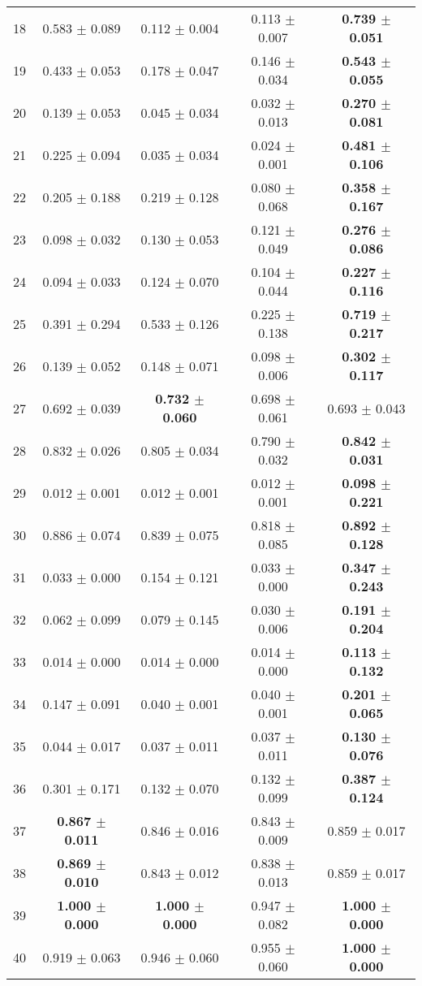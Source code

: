 \begin{table}[!ht]
{\begin{tabular}{r c c c c}
18 & 0.583 $\pm$ 0.089 & 0.112 $\pm$ 0.004 & 0.113 $\pm$ 0.007 & \textbf{0.739 $\pm$ 0.051} \\
19 & 0.433 $\pm$ 0.053 & 0.178 $\pm$ 0.047 & 0.146 $\pm$ 0.034 & \textbf{0.543 $\pm$ 0.055} \\
20 & 0.139 $\pm$ 0.053 & 0.045 $\pm$ 0.034 & 0.032 $\pm$ 0.013 & \textbf{0.270 $\pm$ 0.081} \\
21 & 0.225 $\pm$ 0.094 & 0.035 $\pm$ 0.034 & 0.024 $\pm$ 0.001 & \textbf{0.481 $\pm$ 0.106} \\
22 & 0.205 $\pm$ 0.188 & 0.219 $\pm$ 0.128 & 0.080 $\pm$ 0.068 & \textbf{0.358 $\pm$ 0.167} \\
23 & 0.098 $\pm$ 0.032 & 0.130 $\pm$ 0.053 & 0.121 $\pm$ 0.049 & \textbf{0.276 $\pm$ 0.086} \\
24 & 0.094 $\pm$ 0.033 & 0.124 $\pm$ 0.070 & 0.104 $\pm$ 0.044 & \textbf{0.227 $\pm$ 0.116} \\
25 & 0.391 $\pm$ 0.294 & 0.533 $\pm$ 0.126 & 0.225 $\pm$ 0.138 & \textbf{0.719 $\pm$ 0.217} \\
26 & 0.139 $\pm$ 0.052 & 0.148 $\pm$ 0.071 & 0.098 $\pm$ 0.006 & \textbf{0.302 $\pm$ 0.117} \\
27 & 0.692 $\pm$ 0.039 & \textbf{0.732 $\pm$ 0.060} & 0.698 $\pm$ 0.061 & 0.693 $\pm$ 0.043 \\
28 & 0.832 $\pm$ 0.026 & 0.805 $\pm$ 0.034 & 0.790 $\pm$ 0.032 & \textbf{0.842 $\pm$ 0.031} \\
29 & 0.012 $\pm$ 0.001 & 0.012 $\pm$ 0.001 & 0.012 $\pm$ 0.001 & \textbf{0.098 $\pm$ 0.221} \\
30 & 0.886 $\pm$ 0.074 & 0.839 $\pm$ 0.075 & 0.818 $\pm$ 0.085 & \textbf{0.892 $\pm$ 0.128} \\
31 & 0.033 $\pm$ 0.000 & 0.154 $\pm$ 0.121 & 0.033 $\pm$ 0.000 & \textbf{0.347 $\pm$ 0.243} \\
32 & 0.062 $\pm$ 0.099 & 0.079 $\pm$ 0.145 & 0.030 $\pm$ 0.006 & \textbf{0.191 $\pm$ 0.204} \\
33 & 0.014 $\pm$ 0.000 & 0.014 $\pm$ 0.000 & 0.014 $\pm$ 0.000 & \textbf{0.113 $\pm$ 0.132} \\
34 & 0.147 $\pm$ 0.091 & 0.040 $\pm$ 0.001 & 0.040 $\pm$ 0.001 & \textbf{0.201 $\pm$ 0.065} \\
35 & 0.044 $\pm$ 0.017 & 0.037 $\pm$ 0.011 & 0.037 $\pm$ 0.011 & \textbf{0.130 $\pm$ 0.076} \\
36 & 0.301 $\pm$ 0.171 & 0.132 $\pm$ 0.070 & 0.132 $\pm$ 0.099 & \textbf{0.387 $\pm$ 0.124} \\
37 & \textbf{0.867 $\pm$ 0.011} & 0.846 $\pm$ 0.016 & 0.843 $\pm$ 0.009 & 0.859 $\pm$ 0.017 \\
38 & \textbf{0.869 $\pm$ 0.010} & 0.843 $\pm$ 0.012 & 0.838 $\pm$ 0.013 & 0.859 $\pm$ 0.017 \\
39 & \textbf{1.000 $\pm$ 0.000} & \textbf{1.000 $\pm$ 0.000} & 0.947 $\pm$ 0.082 & \textbf{1.000 $\pm$ 0.000} \\
40 & 0.919 $\pm$ 0.063 & 0.946 $\pm$ 0.060 & 0.955 $\pm$ 0.060 & \textbf{1.000 $\pm$ 0.000} \\
\end{tabular}}
\end{table}

